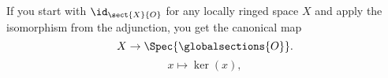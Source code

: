 If you start with $\id_{\sect{X}{O}}$ for any locally ringed space $X$
and apply the isomorphism from the adjunction, you get the canonical map 
\[X \rightarrow \Spec{\globalsections{O}}.\]
\[ x \mapsto \ker(x),\]